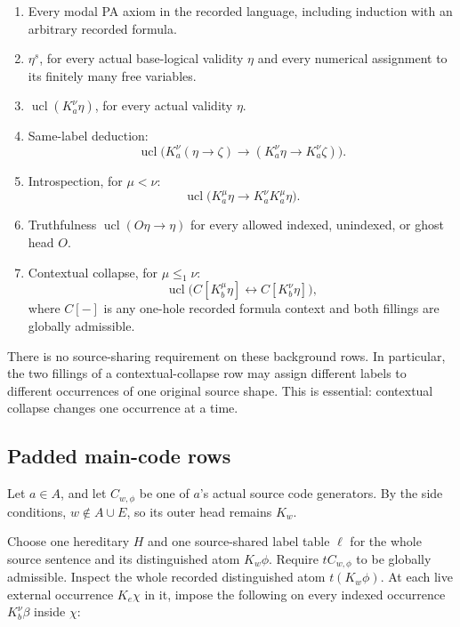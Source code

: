 \documentclass[
  11pt,
  letterpaper,
]{article}
\providecommand{\tightlist}{%
  \setlength{\itemsep}{0pt}\setlength{\parskip}{0pt}}
\begin{document}
\begin{enumerate}
\def\labelenumi{\arabic{enumi}.}
\tightlist
\item
  Every modal PA axiom in the recorded language, including induction
  with an arbitrary recorded formula.
\item
  \(\eta^s\), for every actual base-logical validity \(\eta\) and every
  numerical assignment to its finitely many free variables.
\item
  \(\operatorname{ucl}(K_a^\nu\eta)\), for every actual validity
  \(\eta\).
\item
  Same-label deduction: \[
  \operatorname{ucl}\bigl(
  K_a^\nu(\eta\to\zeta)\to
  (K_a^\nu\eta\to K_a^\nu\zeta)\bigr).
  \]
\item
  Introspection, for \(\mu<\nu\): \[
  \operatorname{ucl}\bigl(
  K_a^\mu\eta\to K_a^\nu K_a^\mu\eta\bigr).
  \]
\item
  Truthfulness \(\operatorname{ucl}(O\eta\to\eta)\) for every allowed
  indexed, unindexed, or ghost head \(O\).
\item
  Contextual collapse, for \(\mu\leq_1\nu\): \[
  \operatorname{ucl}\bigl(
  C[K_b^\mu\eta]\leftrightarrow C[K_b^\nu\eta]\bigr),
  \tag{CC}
  \] where \(C[-]\) is any one-hole recorded formula context and both
  fillings are globally admissible.
\end{enumerate}

There is no source-sharing requirement on these background rows. In
particular, the two fillings of a contextual-collapse row may assign
different labels to different occurrences of one original source shape.
This is essential: contextual collapse changes one occurrence at a time.

\subsection{Padded main-code rows}\label{padded-main-code-rows}

Let \(a\in A\), and let \(C_{w,\phi}\) be one of \(a\)'s actual source
code generators. By the side conditions, \(w\notin A\cup E\), so its
outer head remains \(K_w\).

Choose one hereditary \(H\) and one source-shared label table \(\ell\)
for the whole source sentence and its distinguished atom \(K_w\phi\).
Require \(tC_{w,\phi}\) to be globally admissible. Inspect the whole
recorded distinguished atom \(t(K_w\phi)\). At each live external
occurrence \(K_e\chi\) in it, impose the following on every indexed
occurrence \(K_b^\nu\beta\) inside \(\chi\):
\end{document}
